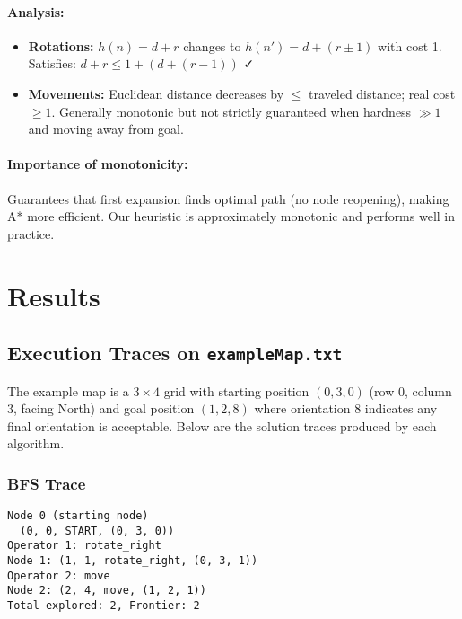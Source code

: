 \documentclass[11pt,a4paper]{article}
\begin{document}
\paragraph{Analysis:}
\begin{itemize}[leftmargin=1.5cm,itemsep=0.1em]
    \item \textbf{Rotations:} $h(n) = d + r$ changes to $h(n') = d + (r \pm 1)$ with cost 1. Satisfies: $d + r \leq 1 + (d + (r-1))$ ✓
    \item \textbf{Movements:} Euclidean distance decreases by $\leq$ traveled distance; real cost $\geq 1$. Generally monotonic but not strictly guaranteed when hardness $\gg 1$ and moving away from goal.
\end{itemize}

\paragraph{Importance of monotonicity:}
Guarantees that first expansion finds optimal path (no node reopening), making A* more efficient. Our heuristic is approximately monotonic and performs well in practice.

\section{Results}

\subsection{Execution Traces on \texttt{exampleMap.txt}}

The example map is a $3 \times 4$ grid with starting position $(0, 3, 0)$ (row 0, column 3, facing North) and goal position $(1, 2, 8)$ where orientation 8 indicates any final orientation is acceptable. Below are the solution traces produced by each algorithm.

\subsubsection{BFS Trace}
\begin{lstlisting}[basicstyle=\ttfamily\tiny]
Node 0 (starting node)
  (0, 0, START, (0, 3, 0))
Operator 1: rotate_right
Node 1: (1, 1, rotate_right, (0, 3, 1))
Operator 2: move
Node 2: (2, 4, move, (1, 2, 1))
Total explored: 2, Frontier: 2
\end{lstlisting}
\end{document}
